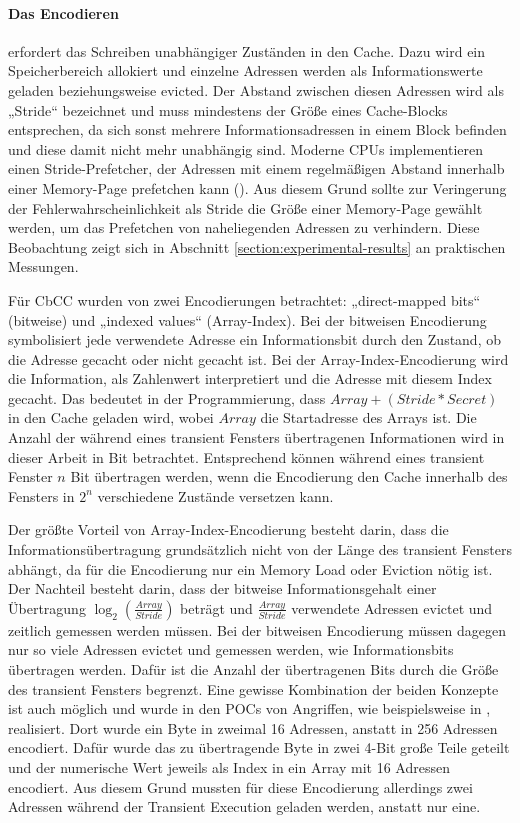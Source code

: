 \paragraph{Das Encodieren}
erfordert das Schreiben unabhängiger Zuständen in den Cache.
Dazu wird ein Speicherbereich
allokiert und einzelne Adressen werden als Informationswerte geladen
beziehungsweise evicted. Der Abstand zwischen diesen Adressen
wird als „Stride“ bezeichnet und muss mindestens der Größe eines
Cache-Blocks entsprechen, da sich sonst mehrere Informationsadressen
in einem Block befinden und  diese damit nicht mehr unabhängig sind.
Moderne \acp{CPU} implementieren einen Stride-Prefetcher, der Adressen mit
einem regelmäßigen Abstand innerhalb einer Memory-Page prefetchen kann
(\cite[739]{saileshwar_streamline_2021}). Aus diesem Grund sollte zur
Veringerung der Fehlerwahrscheinlichkeit als Stride die Größe
einer Memory-Page gewählt werden, um das Prefetchen von naheliegenden
Adressen zu verhindern. Diese Beobachtung zeigt sich in Abschnitt
\ref{section:experimental-results} an praktischen Messungen.

Für \ac{CbCC} wurden von \cite[13]{mcilroy_spectre_2019} zwei
Encodierungen betrachtet: „direct-mapped bits“ (bitweise) und
„indexed values“ (Array-Index). Bei der bitweisen Encodierung
symbolisiert jede verwendete Adresse ein Informationsbit durch
den Zustand, ob die Adresse gecacht oder nicht gecacht ist.
Bei der Array-Index-Encodierung wird die Information, als
Zahlenwert interpretiert und die Adresse mit diesem Index gecacht.
Das bedeutet in der Programmierung, dass $Array+(Stride*Secret)$
in den Cache geladen wird, wobei $Array$ die Startadresse des
Arrays ist.
Die Anzahl der während eines transient Fensters übertragenen
Informationen wird in dieser Arbeit in Bit betrachtet. Entsprechend
können während eines transient Fenster $n$ Bit übertragen werden,
wenn die Encodierung den Cache innerhalb des Fensters in $2^n$
verschiedene Zustände versetzen kann.

Der größte Vorteil von Array-Index-Encodierung besteht darin,
dass die Informationsübertragung grundsätzlich nicht von der
Länge des transient Fensters abhängt, da für die Encodierung
nur ein Memory Load oder Eviction nötig ist. Der Nachteil besteht
darin, dass der bitweise Informationsgehalt einer Übertragung
$\log_{2}\left(\frac{Array}{Stride}\right)$ beträgt und
$\frac{Array}{Stride}$ verwendete Adressen evictet und
zeitlich gemessen werden müssen. Bei der bitweisen Encodierung
müssen dagegen nur so viele Adressen
evictet und gemessen werden, wie Informationsbits übertragen
werden. Dafür ist die Anzahl der übertragenen Bits durch die
Größe des transient Fensters begrenzt. Eine gewisse
Kombination der beiden Konzepte ist auch möglich und wurde in
den \acp{POC} von Angriffen, wie beispielsweise
in \cite{hertogh_rain_nodate}, realisiert. Dort wurde ein Byte
in zweimal 16 Adressen, anstatt in 256 Adressen
encodiert. Dafür wurde das zu übertragende Byte in zwei 4-Bit
große Teile geteilt und der numerische Wert jeweils als Index
in ein Array mit 16 Adressen encodiert. Aus diesem Grund mussten
für diese Encodierung allerdings zwei Adressen während der
Transient Execution geladen werden, anstatt nur eine.

